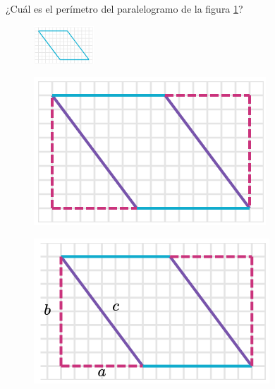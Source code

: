 ¿Cuál es el perímetro del paralelogramo de la figura \ref{fig:peri_paralelogramo_02}?


\begin{figure}[H]
    \centering
    \includegraphics[width=0.2\textwidth]{../images/peri_paralelogramo_02.png}
    \caption{}
    \label{fig:peri_paralelogramo_02}
\end{figure}
\begin{solutionbox}{16cm}
    \begin{minipage}{0.3\textwidth}
        \begin{figure}[H]
            \centering
            \includegraphics[width=0.6\linewidth]{../images/peri_paralelogramo_02a.png}
            \caption{}
            \label{fig:peri_paralelogramo_02a}
        \end{figure}
        \begin{figure}[H]
            \centering
            \includegraphics[width=0.6\linewidth]{../images/peri_paralelogramo_02b.png}
            \caption{}
            \label{fig:peri_paralelogramo_02b}
        \end{figure}

\end{minipage}
\end{solutionbox}
